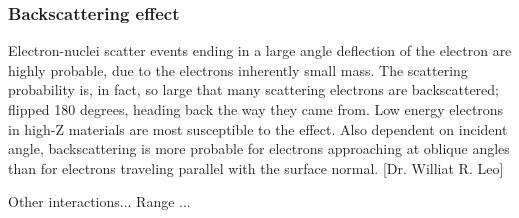 \subsubsection{Backscattering effect}

Electron-nuclei scatter events ending in a large angle deflection of the electron are highly probable, due to the electrons inherently small mass. The scattering probability is, in fact, so large that many scattering electrons are backscattered; flipped 180 degrees, heading back the way they came from. Low energy electrons in high-Z materials are most susceptible to the effect.  Also dependent on incident angle, backscattering is more probable for electrons approaching at oblique angles than for electrons traveling parallel with the surface normal. [Dr. Williat R. Leo]


Other interactions...
Range ...
